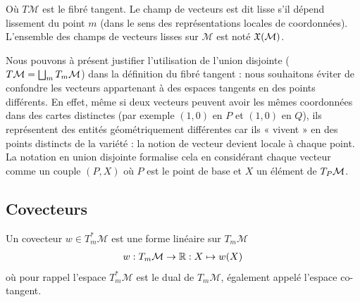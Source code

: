 Où $T\mathcal{M}$ est le fibré tangent. Le champ de vecteurs est dit lisse s'il dépend lissement du point $m$ (dans le sens des représentations locales de coordonnées). L'ensemble des champs de vecteurs lisses sur $\mathcal{M}$ est noté $ \mathfrak{X} (\mathcal{M})$.
\begin{rmk}
    Nous pouvons à présent justifier l'utilisation de l'union disjointe ($T\mathcal{M} = \bigsqcup_m T_m\mathcal{M}$) dans la définition du fibré tangent : nous souhaitons éviter de confondre les vecteurs appartenant à des espaces tangents en des points différents. En effet, même si deux vecteurs peuvent avoir les mêmes coordonnées dans des cartes distinctes (par exemple $(1,0)$ en $P$ et $(1,0)$ en $Q$), ils représentent des entités géométriquement différentes car ils « vivent » en des points distincts de la variété : la notion de vecteur devient locale à chaque point. La notation en union disjointe formalise cela en considérant chaque vecteur comme un couple $(P,X)$ où $P$ est le point de base et $X$ un élément de $T_P\mathcal{M}$.
\end{rmk}
\subsection{Covecteurs}
Un covecteur $w\in T_m^*\mathcal{M}$ est une forme linéaire sur $T_m\mathcal{M}$ 
\begin{align}
w  :  T_m \mathcal{M} \to \mathbb{R} : X \mapsto w(X)
\end{align}
où pour rappel l'espace $T^*_m \mathcal{M}$ est le dual de $T_m\mathcal{M}$, également appelé l'espace co-tangent. 

